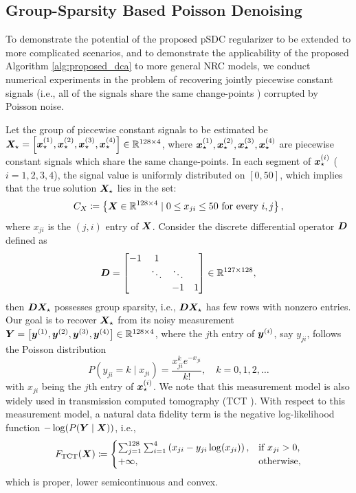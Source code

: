 \documentclass[lettersize,journal]{IEEEtran}
\theoremstyle{plain}%
\theoremstyle{definition}
\theoremstyle{remark}
\begin{document}
\subsection{Group-Sparsity Based Poisson Denoising}\label{sec:poisson_denoising}
To demonstrate the potential of the proposed pSDC regularizer to be extended to more complicated scenarios, and to demonstrate the applicability of the proposed Algorithm \ref{alg:proposed_dca} to more general NRC models, we conduct numerical experiments in the problem of recovering jointly piecewise constant signals (i.e., all of the signals share the same change-points \cite{vert2010}) corrupted by Poisson noise. 

Let the group of piecewise constant signals to be estimated be $\bm{X}_\star=\left[\bm{x}_\star^{(1)}, \bm{x}_\star^{(2)}, \bm{x}_\star^{(3)}, \bm{x}_\star^{(4)}\right]\in\mathbb{R}^{128\times 4}$, where $\bm{x}_\star^{(1)}, \bm{x}_\star^{(2)}, \bm{x}_\star^{(3)}, \bm{x}_\star^{(4)}$ are piecewise constant signals which share the same change-points. In each segment of $\bm{x}_\star^{(i)}$ ($i=1,2,3,4$), the signal value is uniformly distributed on $[0,50]$, which implies that the true solution $\bm{X}_\star$ lies in the set:
\begin{equation}
C_X\coloneqq \left\{ \bm{X}\in\mathbb{R}^{128\times 4}\mid 0\leq x_{ji}\leq 50 \textrm{ for every }i,j \right\},
\end{equation}
where $x_{ji}$ is the $(j,i)$ entry of $\bm{X}$. Consider the discrete differential operator $\bm{D}$ defined as
\begin{equation}
\bm{D}=\begin{bmatrix}
-1 & 1 &   & \\
 &  \ddots & \ddots &  \\
&  & -1 & 1 
\end{bmatrix}\in\mathbb{R}^{127\times 128},
\end{equation}
then $\bm{D}\bm{X}_{\star}$ possesses group sparsity, i.e., $\bm{D}\bm{X}_{\star}$ has few rows with nonzero entries. Our goal is to recover $\bm{X}_{\star}$ from its noisy measurement $\bm{Y}=\left[\bm{y}^{(1)},\bm{y}^{(2)},\bm{y}^{(3)},\bm{y}^{(4)}\right]\in\mathbb{R}^{128\times 4}$, where the $j$th entry of $\bm{y}^{(i)}$, say $y_{ji}$, follows the Poisson distribution
\begin{equation}
P\left(y_{ji}=k\mid x_{ji}\right)=\frac{x_{ji}^ke^{-x_{ji}}}{k!}, \quad k=0,1,2,\dots
\end{equation}
with $x_{ji}$ being the $j$th entry of $\bm{x}^{(i)}_{\star}$. We note that this measurement model is also widely used in transmission computed tomography (TCT \cite{bouman1996}). With respect to this measurement model, a natural data fidelity term is the negative log-likelihood function $-\log(P(\bm{Y}\mid\bm{X}))$, i.e.,
\begin{equation*}
F_{\textrm{TCT}}(\bm{X})\coloneqq \begin{cases}
\sum_{j=1}^{128}\sum_{i=1}^4 \left( x_{ji}-y_{ji}\log(x_{ji}) \right ), & \textrm{if }x_{ji}>0,\\
+\infty, & \textrm{otherwise},
\end{cases}
\end{equation*}
which is proper, lower semicontinuous and convex.
\end{document}
